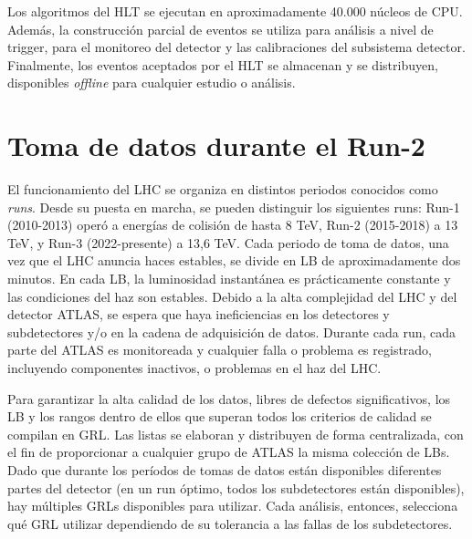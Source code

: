 Los algoritmos del \ac{HLT} se ejecutan en aproximadamente 40.000 núcleos de CPU. Además, la construcción parcial de eventos se utiliza para análisis a nivel de trigger, para el monitoreo del detector y las calibraciones del subsistema detector. Finalmente, los eventos aceptados por el \ac{HLT} se almacenan y se distribuyen, disponibles \textit{offline} para cualquier estudio o análisis.






\FloatBarrier
\section{Toma de datos durante el Run-2}
\label{sec:atlas:runs}


El funcionamiento del \ac{LHC} se organiza en distintos periodos conocidos como \textit{runs}.
Desde su puesta en marcha, se pueden distinguir los siguientes runs: Run-1 (2010-2013) operó a energías de colisión de hasta 8 TeV, Run-2 (2015-2018) a 13 TeV, y Run-3 (2022-presente) a 13,6 TeV. Cada periodo de toma de datos, una vez que el \ac{LHC} anuncia haces estables, se divide en \ac{LB} de aproximadamente dos minutos. En cada \ac{LB}, la luminosidad instantánea es prácticamente constante y las condiciones del haz son estables. Debido a la alta complejidad del \ac{LHC} y del detector \ac{ATLAS}, se espera que haya ineficiencias en los detectores y subdetectores y/o en la cadena de adquisición de datos. Durante cada run, cada parte del \ac{ATLAS} es monitoreada y cualquier falla o problema es registrado, incluyendo componentes inactivos, o problemas en el haz del \ac{LHC}.

Para garantizar la alta calidad de los datos, libres de defectos significativos, los \ac{LB} y los rangos dentro de ellos que superan todos los criterios de calidad se compilan en \ac{GRL}. Las listas se elaboran y distribuyen de forma centralizada, con el fin de proporcionar a cualquier grupo de \ac{ATLAS} la misma colección de \acp{LB}. Dado que durante los per\'iodos de tomas de datos están disponibles diferentes partes del detector (en un run óptimo, todos los subdetectores están disponibles), hay múltiples \acp{GRL} disponibles para utilizar. Cada análisis, entonces, selecciona qué \ac{GRL} utilizar dependiendo de su tolerancia a las fallas de los subdetectores.

